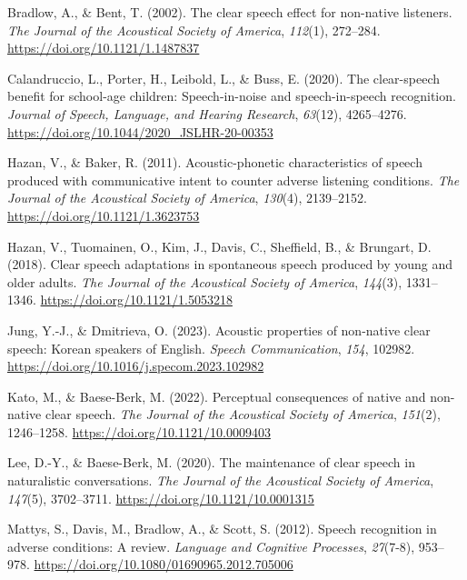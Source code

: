\documentclass[
  man,
  floatsintext,
  longtable,
  nolmodern,
  notxfonts,
  notimes,
  colorlinks=true,linkcolor=blue,citecolor=blue,urlcolor=blue]{apa7}
\newlength{\cslhangindent}
\newenvironment{CSLReferences}[2] %
 {\begin{list}{}{%
  \setlength{\itemindent}{0pt}
  \setlength{\leftmargin}{0pt}
  \setlength{\parsep}{0pt}
  \ifodd #1
   \setlength{\leftmargin}{\cslhangindent}
   \setlength{\itemindent}{-1\cslhangindent}
  \fi
  \setlength{\itemsep}{#2\baselineskip}}}
 {\end{list}}
\begin{document}
\label{refs}
\begin{CSLReferences}{1}{0}
Bradlow, A., \& Bent, T. (2002). The clear speech effect for non-native
listeners. \emph{The Journal of the Acoustical Society of America},
\emph{112}(1), 272--284. \url{https://doi.org/10.1121/1.1487837}

Calandruccio, L., Porter, H., Leibold, L., \& Buss, E. (2020). The
clear-speech benefit for school-age children: {Speech}-in-noise and
speech-in-speech recognition. \emph{Journal of Speech, Language, and
Hearing Research}, \emph{63}(12), 4265--4276.
\url{https://doi.org/10.1044/2020_JSLHR-20-00353}

Hazan, V., \& Baker, R. (2011). Acoustic-phonetic characteristics of
speech produced with communicative intent to counter adverse listening
conditions. \emph{The Journal of the Acoustical Society of America},
\emph{130}(4), 2139--2152. \url{https://doi.org/10.1121/1.3623753}

Hazan, V., Tuomainen, O., Kim, J., Davis, C., Sheffield, B., \&
Brungart, D. (2018). Clear speech adaptations in spontaneous speech
produced by young and older adults. \emph{The Journal of the Acoustical
Society of America}, \emph{144}(3), 1331--1346.
\url{https://doi.org/10.1121/1.5053218}

Jung, Y.-J., \& Dmitrieva, O. (2023). Acoustic properties of non-native
clear speech: {Korean} speakers of {English}. \emph{Speech
Communication}, \emph{154}, 102982.
\url{https://doi.org/10.1016/j.specom.2023.102982}

Kato, M., \& Baese-Berk, M. (2022). Perceptual consequences of native
and non-native clear speech. \emph{The Journal of the Acoustical Society
of America}, \emph{151}(2), 1246--1258.
\url{https://doi.org/10.1121/10.0009403}

Lee, D.-Y., \& Baese-Berk, M. (2020). The maintenance of clear speech in
naturalistic conversations. \emph{The Journal of the Acoustical Society
of America}, \emph{147}(5), 3702--3711.
\url{https://doi.org/10.1121/10.0001315}

Mattys, S., Davis, M., Bradlow, A., \& Scott, S. (2012). Speech
recognition in adverse conditions: {A} review. \emph{Language and
Cognitive Processes}, \emph{27}(7-8), 953--978.
\url{https://doi.org/10.1080/01690965.2012.705006}


\end{CSLReferences}
\end{document}

